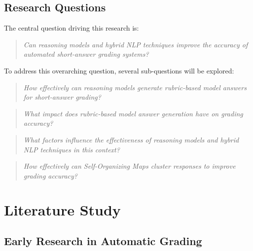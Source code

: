 \documentclass[a4paper,10pt]{article}
\begin{document}
\subsection{Research Questions}
The central question driving this research is:
\begin{quote}
    \textit{Can reasoning models and hybrid NLP techniques improve the accuracy of automated short-answer grading systems?}
\end{quote}

To address this overarching question, several sub-questions will be explored:
\begin{quote}
    \textit{How effectively can reasoning models generate rubric-based model answers for short-answer grading?}
\end{quote}
\begin{quote}
    \textit{What impact does rubric-based model answer generation have on grading accuracy?}
\end{quote}
\begin{quote}
    \textit{What factors influence the effectiveness of reasoning models and hybrid NLP techniques in this context?}
\end{quote}
\begin{quote}
    \textit{How effectively can Self-Organizing Maps cluster responses to improve grading accuracy?}
\end{quote}

\section{Literature Study}
\subsection{Early Research in Automatic Grading}
\end{document}
